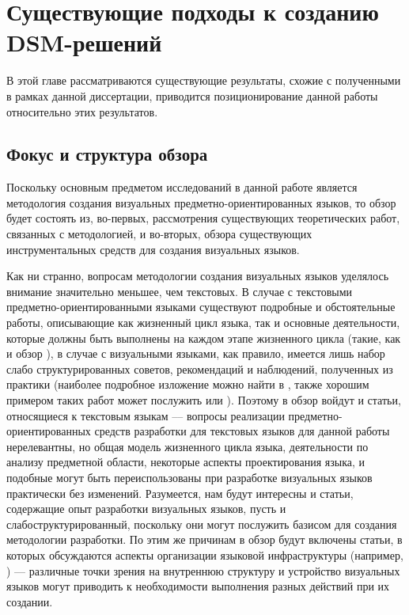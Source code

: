 \chapter{Существующие подходы к созданию DSM-решений}
В этой главе рассматриваются существующие результаты, схожие с полученными в рамках 
данной диссертации, приводится позиционирование данной работы относительно этих результатов.

\section{Фокус и структура обзора}
Поскольку основным предметом исследований в данной работе является методология создания 
визуальных предметно-ориентированных языков, то обзор будет состоять из, во-первых, 
рассмотрения существующих теоретических работ, связанных с методологией, и во-вторых, 
обзора существующих инструментальных средств для создания визуальных языков.

Как ни странно, вопросам методологии создания визуальных языков уделялось внимание 
значительно меньшее, чем текстовых. В случае с текстовыми предметно-ориентированными
языками существуют подробные и обстоятельные работы, описывающие как жизненный цикл
языка, так и основные деятельности, которые должны быть выполнены на каждом этапе
жизненного цикла (такие, как \cite{mernik2005and} и обзор \cite{van2000domain}), в 
случае с визуальными языками, как правило, имеется лишь набор слабо структурированных
советов, рекомендаций и наблюдений, полученных из практики (наиболее подробное изложение 
можно найти в \cite{kelly2008domain}, также хорошим примером таких работ может послужить 
\cite{voelter2009best} или \cite{luoma2004defining}). Поэтому в обзор войдут и статьи, 
относящиеся к текстовым языкам --– вопросы реализации предметно-ориентированных средств 
разработки для текстовых языков для данной работы нерелевантны, но общая модель жизненного 
цикла языка, деятельности по анализу предметной области, некоторые аспекты проектирования 
языка, и подобные могут быть переиспользованы при разработке визуальных языков практически 
без изменений. Разумеется, нам будут интересны и статьи, содержащие опыт разработки 
визуальных языков, пусть и слабоструктурированный, поскольку они могут послужить базисом 
для создания методологии разработки. По этим же причинам в обзор будут включены статьи, 
в которых обсуждаются аспекты организации языковой инфраструктуры (например, \cite{atkinson2003model}) 
--– различные точки зрения на внутреннюю структуру и устройство визуальных языков 
могут приводить к необходимости выполнения разных действий при их создании.

